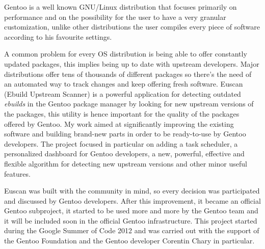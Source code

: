 
Gentoo is a well known GNU/Linux distribution that focuses primarily on performance and on the possibility for the user to have a very granular customization, unlike other distributions the user compiles every piece of software according to his favourite settings.

A common problem for every OS distribution is being able to offer constantly updated packages, this implies being up to date with upstream developers. Major distributions offer tens of thousands of different packages so there’s the need of an automated way to track changes and keep offering fresh software.
Euscan (Ebuild Upstream Scanner) is a powerful application for detecting outdated \emph{ebuilds} in the Gentoo package manager by looking for new upstream versions of the packages, this utility is hence important for the quality of the packages offered by Gentoo.
My work aimed at significantly improving the existing software and building brand-new parts in order to be ready-to-use by Gentoo developers. The project focused in particular on adding a task scheduler, a personalized dashboard for Gentoo developers, a new, powerful, effective and flexible algorithm for detecting new upstream versions and other minor useful features.

Euscan was built with the community in mind, so every decision was participated and discussed by Gentoo developers. After this improvement, it became an official Gentoo subproject, it started to be used more and more by the Gentoo team and it will be included soon in the official Gentoo infrastructure.
This project started during the Google Summer of Code 2012 and was carried out with the support of the Gentoo Foundation and the Gentoo developer Corentin Chary in particular.
